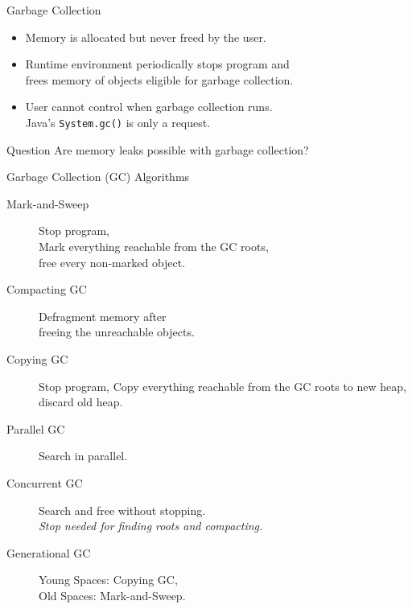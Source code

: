 \begin{Frame}{Garbage Collection}
  \begin{itemize}
    \item Memory is allocated but never freed by the user.
    \item Runtime environment periodically stops program and\\
      frees memory of objects eligible for garbage collection.
    \item User cannot control when garbage collection runs.\\
      Java's \texttt{System.gc()} is only a request.
  \end{itemize}

  \xxx

  \begin{exampleblock}{Question}
    Are memory leaks possible with garbage collection?
  \end{exampleblock}
\end{Frame}

\begin{Frame}{Garbage Collection (GC) Algorithms}
  \begin{description}
    \item[Mark-and-Sweep] Stop program,\\
      Mark everything reachable from the GC roots,\\
      free every non-marked object.
    \item[Compacting GC] Defragment memory after\\
      freeing the unreachable objects.
    \item[Copying GC] Stop program, Copy everything reachable from the GC roots to new heap, discard old heap.
    \item[Parallel GC] Search in parallel.
    \item[Concurrent GC] Search and free without stopping.\\
      \emph{Stop needed for finding roots and compacting.}
    \item[Generational GC] Young Spaces: Copying GC,\\
      Old Spaces: Mark-and-Sweep.
  \end{description}
\end{Frame}


